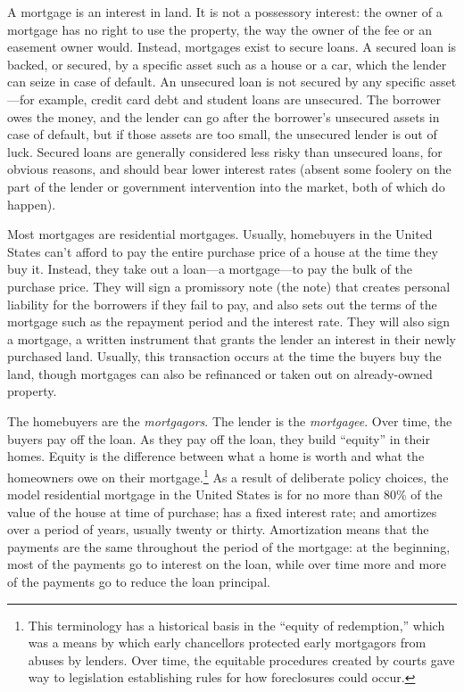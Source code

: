 A mortgage is an interest in land.  It is not a possessory interest: the owner
of a mortgage has no right to use the property, the way the owner of the fee or
an easement owner would.  Instead, mortgages exist to secure loans.  A secured
loan is backed, or secured, by a specific asset such as a house or a car, which
the lender can seize in case of default.  An unsecured loan is not secured by
any specific asset---for example, credit card debt and student loans are
unsecured.  The borrower owes the money, and the lender can go after the
borrower's unsecured assets in case of default, but if those assets are too
small, the unsecured lender is out of luck.  Secured loans are generally
considered less risky than unsecured loans, for obvious reasons, and should
bear lower interest rates (absent some foolery on the part of the lender or
government intervention into the market, both of which do happen).  

Most mortgages are residential mortgages.  Usually, homebuyers in the United
States can't afford to pay the entire purchase price of a house at the time they
buy it. Instead, they take out a loan---a mortgage---to pay the bulk of the
purchase price.  They will sign a promissory note (the note) that creates
personal liability for the borrowers if they fail to pay, and also sets out the
terms of the mortgage such as the repayment period and the interest rate.  They
will also sign a mortgage, a written instrument that grants the lender an
interest in their newly purchased land.  Usually, this transaction occurs at the
time the buyers buy the land, though mortgages can also be refinanced or taken
out on already-owned property.

The homebuyers are the \textit{mortgagors}.  The lender is the
\textit{mortgagee}.  Over time, the buyers pay off the loan.  As they pay off
the loan, they build ``equity'' in their homes.  Equity is the difference
between what a home is worth and what the homeowners owe on their
mortgage.\footnote{This terminology has a historical basis in the ``equity of
redemption,'' which was a means by which early chancellors protected early
mortgagors from abuses by lenders.  Over time, the equitable procedures created
by courts gave way to legislation establishing rules for how foreclosures could
occur.}  As a result of deliberate policy choices, the model residential
mortgage in the United States is for no more than 80\% of the value of the house
at time of purchase; has a fixed interest rate; and amortizes over a period of
years, usually twenty or thirty.  Amortization means that the payments are the
same throughout the period of the mortgage: at the beginning, most of the
payments go to interest on the loan, while over time more and more of the
payments go to reduce the loan principal.  


